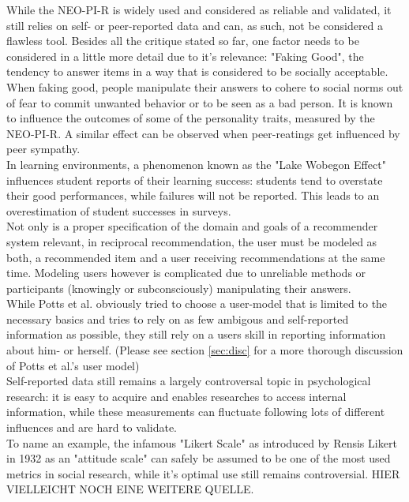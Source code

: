 \documentclass[nochapterpage,bigchapter,linedtoc,longdoc,colorback,accentcolor=tud3b]{tudreport}
\begin{document}
While the NEO-PI-R is widely used and considered as reliable and validated, it still relies on self- or peer-reported data and can, as such, not be considered a flawless tool. Besides all the critique stated so far, one factor needs to be considered in a little more detail due to it's relevance: "Faking Good", the tendency to answer items in a way that is considered to be socially acceptable. When faking good, people manipulate their answers to cohere to social norms out of fear to commit unwanted behavior or to be seen as a bad person. It is known to influence the outcomes of some of the personality traits, measured by the NEO-PI-R.\cite{griffin2004applicants} A similar effect can be observed when peer-reatings get influenced by peer sympathy. \cite{leising2010letter}\\
In learning environments, a phenomenon known as the "Lake Wobegon Effect" influences student reports of their learning success: students tend to overstate their good performances, while failures will not be reported. This leads to an overestimation of student successes in surveys. \cite{maxwell1994lake}\\
Not only is a proper specification of the domain and goals of a recommender system relevant, in reciprocal recommendation, the user must be modeled as both, a recommended item and a user receiving recommendations at the same time. Modeling users however is complicated due to unreliable methods or participants (knowingly or subconsciously) manipulating their answers.\\
While Potts et al. obviously tried to choose a user-model that is limited to the necessary basics and tries to rely on as few ambigous and self-reported information as possible, they still rely on a users skill in reporting information about him- or herself. (Please see section \ref{sec:disc} for a more thorough discussion of Potts et al.'s user model)\\
Self-reported data still remains a largely controversal topic in psychological research: it is easy to acquire and enables researches to access internal information,  while these measurements can fluctuate following lots of different influences and are hard to validate. \cite{gonyea2005self, lee2002cultural, sorensen2008measuring}\\
To name an example, the infamous "Likert Scale" as introduced by Rensis Likert in 1932 as an "attitude scale" \cite{likert1932technique} can safely be assumed to be one of the most used metrics in social research, while it's optimal use still remains controversial. \cite{chang1994psychometric, lee2002cultural} HIER VIELLEICHT NOCH EINE WEITERE QUELLE.\\
\end{document}

